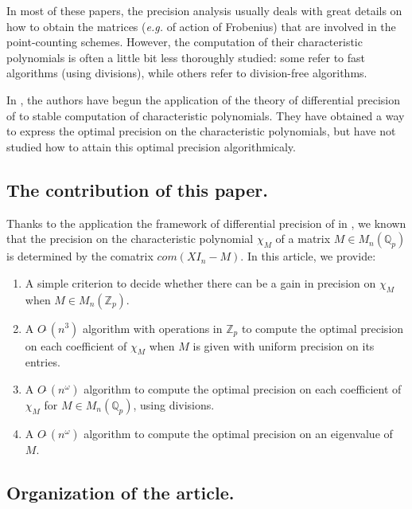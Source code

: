 \documentclass{sig-alternate-05-2015}
\newcommand{\Z}{\mathbb Z}
\newcommand{\Zp}{\Z_p}
\newcommand{\Q}{\mathbb Q}
\newcommand{\Qp}{\Q_p}
\newcommand{\softO}{O\tilde{~}}
\begin{document}
In most of these papers, the precision analysis usually
deals with great details on how to obtain the matrices (\textit{e.g.} of action of Frobenius)  that are involved in the point-counting schemes.
However, the computation of their characteristic polynomials is often
a little bit less thoroughly studied: some
refer to fast algorithms (using divisions), while others
refer to division-free algorithms.

In \cite{caruso-roe-vaccon:15a}, the authors have begun the application
of the theory of differential precision of \cite{caruso-roe-vaccon:14a}
to stable computation of characteristic polynomials.
They have obtained a way to express the optimal precision
on the characteristic polynomials, but have not studied 
how to attain this optimal precision algorithmicaly.


\subsection*{The contribution of this paper.}

Thanks to the application the framework of differential precision of 
\cite{caruso-roe-vaccon:14a} in \cite{caruso-roe-vaccon:15a}, we known 
that the precision on the characteristic polynomial $\chi_M$ of a matrix 
$M \in M_n(\mathbb{Q}_p)$ is determined by the comatrix $com(X I_n -M).$ 
In this article, we provide:
\begin{enumerate}
\renewcommand{\itemsep}{0pt}
\item A simple criterion to decide whether there can be a gain in precision
on $\chi_M$ when $M \in M_n(\mathbb{Z}_p).$
\item A $\softO (n^3)$ algorithm with operations in $\Zp$ to compute the 
optimal precision on each coefficient of $\chi_M$ when $M$ is given with 
uniform precision on its entries.
\item A $\softO (n^\omega)$ algorithm to compute the 
optimal precision on each coefficient of $\chi_M$
for $M \in M_n (\Qp)$, using divisions.
\item A $\softO (n^\omega)$ algorithm to compute the 
optimal precision on an eigenvalue of $M$.
\end{enumerate}


\subsection*{Organization of the article.}
\end{document}
